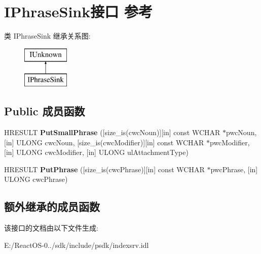 \hypertarget{interface_i_phrase_sink}{}\section{I\+Phrase\+Sink接口 参考}
\label{interface_i_phrase_sink}
类 I\+Phrase\+Sink 继承关系图\+:\begin{figure}[H]
\begin{center}
\leavevmode
\includegraphics[height=2.000000cm]{interface_i_phrase_sink}
\end{center}
\end{figure}
\subsection*{Public 成员函数}
\begin{DoxyCompactItemize}
\item 
\mbox{\label{interface_i_phrase_sink_a58a81aa773bc8443b4a56c67a0d46d22}} 
H\+R\+E\+S\+U\+LT {\bfseries Put\+Small\+Phrase} (\mbox{[}size\+\_\+is(cwc\+Noun)\mbox{]}\mbox{[}in\mbox{]} const W\+C\+H\+AR $\ast$pwc\+Noun, \mbox{[}in\mbox{]} U\+L\+O\+NG cwc\+Noun, \mbox{[}size\+\_\+is(cwc\+Modifier)\mbox{]}\mbox{[}in\mbox{]} const W\+C\+H\+AR $\ast$pwc\+Modifier, \mbox{[}in\mbox{]} U\+L\+O\+NG cwc\+Modifier, \mbox{[}in\mbox{]} U\+L\+O\+NG ul\+Attachment\+Type)
\item 
\mbox{\label{interface_i_phrase_sink_ad049ab99180a5196a911b46ebd3a94ff}} 
H\+R\+E\+S\+U\+LT {\bfseries Put\+Phrase} (\mbox{[}size\+\_\+is(cwc\+Phrase)\mbox{]}\mbox{[}in\mbox{]} const W\+C\+H\+AR $\ast$pwc\+Phrase, \mbox{[}in\mbox{]} U\+L\+O\+NG cwc\+Phrase)
\end{DoxyCompactItemize}
\subsection*{额外继承的成员函数}


该接口的文档由以下文件生成\+:\begin{DoxyCompactItemize}
\item 
E\+:/\+React\+O\+S-\/0../sdk/include/psdk/indexsrv.\+idl\end{DoxyCompactItemize}

